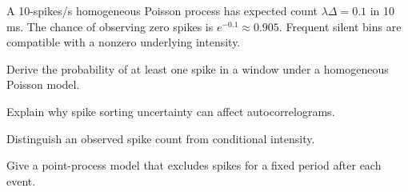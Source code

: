 \begin{workedexample}
A 10-spikes/s homogeneous Poisson process has expected count $\lambda\Delta=0.1$ in 10 ms. The chance of observing zero spikes is $e^{-0.1}\approx0.905$. Frequent silent bins are compatible with a nonzero underlying intensity.
\end{workedexample}
\begin{exercises}
\item Derive the probability of at least one spike in a window under a homogeneous Poisson model.
\item Explain why spike sorting uncertainty can affect autocorrelograms.
\item Distinguish an observed spike count from conditional intensity.
\item Give a point-process model that excludes spikes for a fixed period after each event.
\end{exercises}